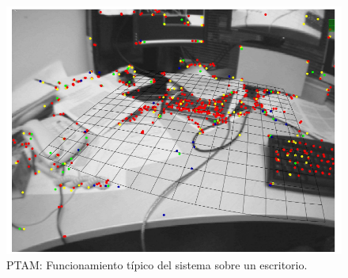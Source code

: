 \begin{figure}[th]
\centering
\includegraphics[scale=0.4]{Figures/ptam.png}
\decoRule
\caption[Ptam]{PTAM: Funcionamiento típico del sistema sobre un escritorio.}
\label{fig:Ptam}
\end{figure}

